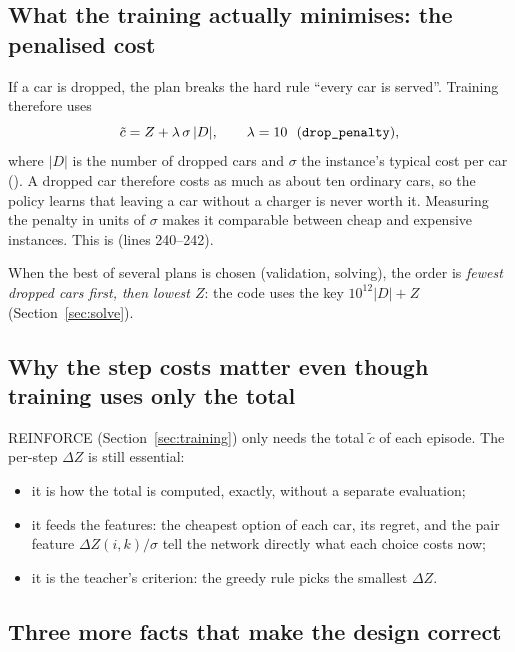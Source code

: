 \subsection{What the training actually minimises: the penalised cost}

If a car is dropped, the plan breaks the hard rule ``every car is served''. Training therefore uses
\[
\tilde c=Z+\lambda\,\sigma\,|D|,\qquad \lambda=10\ \ (\text{\code{drop\_penalty}}),
\]
where $|D|$ is the number of dropped cars and $\sigma$ the instance's typical cost per car (). A dropped car therefore costs as much as about ten ordinary cars, so the policy learns that leaving a car without a charger is never worth it. Measuring the penalty in units of $\sigma$ makes it comparable between cheap and expensive instances. This is  (lines 240--242).

When the best of several plans is chosen (validation, solving), the order is \emph{fewest dropped cars first, then lowest $Z$}: the code uses the key $10^{12}|D|+Z$ (Section~\ref{sec:solve}).

\subsection{Why the step costs matter even though training uses only the total}

REINFORCE (Section~\ref{sec:training}) only needs the total $\tilde c$ of each episode. The per-step $\Delta Z$ is still essential:
\begin{itemize}
  \item it is how the total is computed, exactly, without a separate evaluation;
  \item it feeds the features: the cheapest option of each car, its regret, and the pair feature $\Delta Z(i,k)/\sigma$ tell the network directly what each choice costs now;
  \item it is the teacher's criterion: the greedy rule picks the smallest $\Delta Z$.
\end{itemize}

\subsection{Three more facts that make the design correct}

